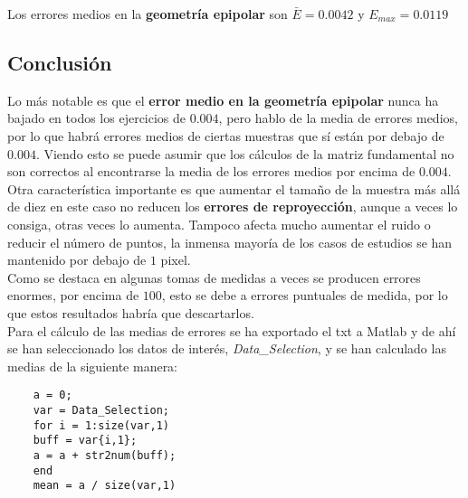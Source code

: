 \documentclass[a4paper, fontsize=11pt]{scrartcl} %
\numberwithin{equation}{section} %
\numberwithin{figure}{section} %
\numberwithin{table}{section} %
\begin{document}
	Los errores medios en la \textbf{geometría epipolar} son $\bar{E} = 0.0042$ y $E_{max} = 0.0119$
	
	
	\subsection{Conclusión}
	
	Lo más notable es que el \textbf{error medio en la geometría epipolar} nunca ha bajado en todos los ejercicios de $0.004$, pero hablo de la media de errores medios, por lo que habrá errores medios de ciertas muestras que sí están por debajo de $0.004$. Viendo esto se puede asumir que los cálculos de la matriz fundamental no son correctos al encontrarse la media de los errores medios por encima de $0.004$.\\
	
	Otra característica importante es que aumentar el tamaño de la muestra más allá de diez en este caso no reducen los \textbf{errores de reproyección}, aunque a veces lo consiga, otras veces lo aumenta. Tampoco afecta mucho aumentar el ruido o reducir el número de puntos, la inmensa mayoría de los casos de estudios se han mantenido por debajo de $1$ pixel.\\
	
	Como se destaca en algunas tomas de medidas a veces se producen errores enormes, por encima de $100$, esto se debe a errores puntuales de medida, por lo que estos resultados habría que descartarlos.\\
	
	Para el cálculo de las medias de errores se ha exportado el txt a Matlab y de ahí se han seleccionado los datos de interés, \textit{Data\_Selection}, y se han calculado las medias de la siguiente manera:
	\begin{lstlisting}
	a = 0;
	var = Data_Selection;
	for i = 1:size(var,1)
	buff = var{i,1};
	a = a + str2num(buff);
	end
	mean = a / size(var,1)
	\end{lstlisting}
	
\end{document}
